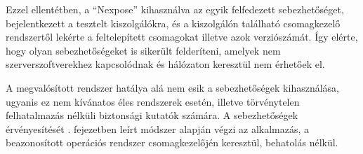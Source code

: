	Ezzel ellentétben, a ``Nexpose'' kihasználva az egyik felfedezett sebezhetőséget, bejelentkezett a tesztelt kiszolgálókra, és a kiszolgálón található csomagkezelő rendszertől lekérte a feltelepített csomagokat illetve azok verziószámát. Így elérte, hogy olyan sebezhetőségeket is sikerült felderíteni, amelyek nem szerverszoftverekhez kapcsolódnak és hálózaton keresztül nem érhetőek el.
	
	A megvalósított rendszer hatálya alá nem esik a sebezhetőségek kihasználása, ugyanis ez nem kívánatos éles rendszerek esetén, illetve törvénytelen felhatalmazás nélküli biztonsági kutatók számára. A sebezhetőségek érvényesítését \az{\ref{ssec:vulnvalid}}. fejezetben leírt módszer alapján végzi az alkalmazás, a beazonosított operációs rendszer csomagkezelőjén keresztül, behatolás nélkül.
